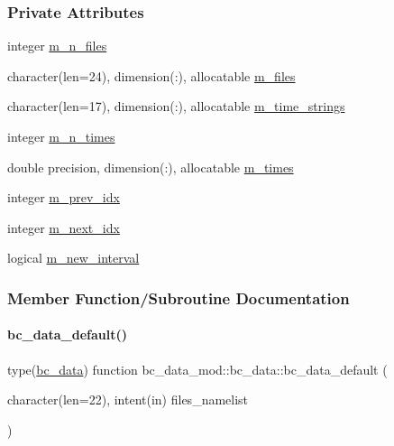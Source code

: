 \subsubsection*{Private Attributes}
\begin{DoxyCompactItemize}
\item 
integer \mbox{\hyperlink{structbc__data__mod_1_1bc__data_a49a8569566c05d9bbab1d8592252d126}{m\+\_\+n\+\_\+files}}
\item 
character(len=24), dimension(\+:), allocatable \mbox{\hyperlink{structbc__data__mod_1_1bc__data_a5785afc144fb332bc2192e16ca6cfc4c}{m\+\_\+files}}
\item 
character(len=17), dimension(\+:), allocatable \mbox{\hyperlink{structbc__data__mod_1_1bc__data_a4bc7f15cecef9103e9cffdd2dc207935}{m\+\_\+time\+\_\+strings}}
\item 
integer \mbox{\hyperlink{structbc__data__mod_1_1bc__data_ac59b5fae46e0c7bf5b0f56aca59bb273}{m\+\_\+n\+\_\+times}}
\item 
double precision, dimension(\+:), allocatable \mbox{\hyperlink{structbc__data__mod_1_1bc__data_a92c42d3e066a22a473ab21707edf3fda}{m\+\_\+times}}
\item 
integer \mbox{\hyperlink{structbc__data__mod_1_1bc__data_a9483d31271a4d20b053aa437eee51b2b}{m\+\_\+prev\+\_\+idx}}
\item 
integer \mbox{\hyperlink{structbc__data__mod_1_1bc__data_adc45e6826431d7e49919491b7683c3fd}{m\+\_\+next\+\_\+idx}}
\item 
logical \mbox{\hyperlink{structbc__data__mod_1_1bc__data_a8d540dbf0910bb3307c2cd5573762306}{m\+\_\+new\+\_\+interval}}
\end{DoxyCompactItemize}


\subsubsection{Member Function/\+Subroutine Documentation}
\mbox{\label{structbc__data__mod_1_1bc__data_aa4e512b1f44734058e9475f8c57636c7}} 
\paragraph{\texorpdfstring{bc\+\_\+data\+\_\+default()}{bc\_data\_default()}}
{\footnotesize\ttfamily type(\mbox{\hyperlink{structbc__data__mod_1_1bc__data}{bc\+\_\+data}}) function bc\+\_\+data\+\_\+mod\+::bc\+\_\+data\+::bc\+\_\+data\+\_\+default (\begin{DoxyParamCaption}\item[{character(len=22), intent(in)}]{files\+\_\+namelist }\end{DoxyParamCaption})\hspace{0.3cm}{\ttfamily [private]}}

